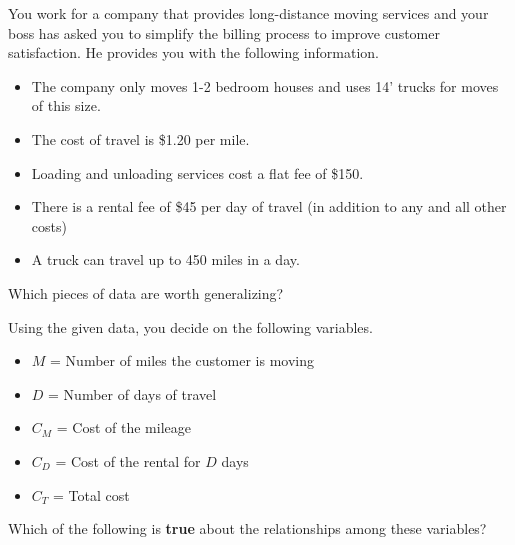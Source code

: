 \documentclass{ximera}
\begin{document}
\begin{problem}
    You work for a company that provides long-distance moving services and your boss has asked you to simplify the billing process to improve customer satisfaction.  He provides you with the following information.
    \begin{itemize}
        \item The company only moves 1-2 bedroom houses and uses 14' trucks for moves of this size.
        \item The cost of travel is \$1.20 per mile.
        \item Loading and unloading services cost a flat fee of \$150.
        \item There is a rental fee of \$45 per day of travel (in addition to any and all other costs)
        \item A truck can travel up to 450 miles in a day.
    \end{itemize}
    Which pieces of data are worth generalizing?
    \begin{selectAll}
    \end{selectAll}

    \begin{problem}
        Using the given data, you decide on the following variables.
        \begin{itemize}
            \item $M$ = Number of miles the customer is moving
            \item $D$ = Number of days of travel
            \item $C_M$ = Cost of the mileage
            \item $C_D$ = Cost of the rental for $D$ days
            \item $C_T$ = Total cost
        \end{itemize}
        Which of the following is \textbf{true} about the relationships among these variables?
        \begin{multipleChoice}
        \end{multipleChoice}


\end{problem}
\end{problem}
\end{document}
